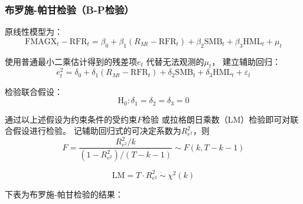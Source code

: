\documentclass[UTF8]{ctexart}
\begin{document}
\subsubsection{布罗施-帕甘检验（B-P检验）}

原线性模型为：
\begin{equation}
  \text{FMAGX}_t-\mathrm{RFR}_t=\beta_0+\beta_1\left( R_{Mt}-\mathrm{RFR}_t \right)+ \beta_2\mathrm{SMB}_t+\beta_3\mathrm{HML}_t + \mu_t
\end{equation}

使用普通最小二乘估计得到的残差项$e_t$
代替无法观测的$\mu_t$，
建立辅助回归：
\begin{equation}
  e_t^2 = \delta_0+\delta_1\left(R_{Mt}-\mathrm{RFR}_t\right)+\delta_2\mathrm{SMB}_t+\delta_3\mathrm{HML}_t + \varepsilon_t
\end{equation}

检验联合假设：
\begin{equation}
  \mathrm{H_0}:\delta_1=\delta_2=\delta_3=0
\end{equation}

通过以上述假设为约束条件的受约束$F$检验
或拉格朗日乘数（LM）检验即可对联合假设进行检验。
记辅助回归式的可决定系数为$R_{e^2}^2$，则
\begin{equation}
  F=\frac{R_{e^{2}}^{2} / k}{\left(1-R_{e^{2}}^{2}\right) /(T-k-1)} \sim F(k,T-k-1)
\end{equation}

\begin{equation}
  \mathrm{LM}=T \cdot R_{e^{2}}^{2}\ \dot \sim\ \chi^{2}(k)
\end{equation}

下表为布罗施-帕甘检验的结果：

\end{document}
